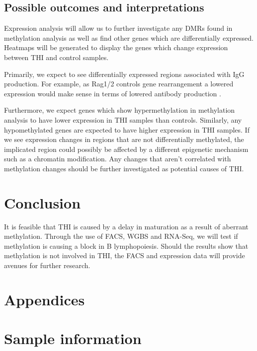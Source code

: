 \documentclass[12pt]{article}
\begin{document}
		\subsection{Possible outcomes and interpretations}				
			
			Expression analysis will allow us to  further investigate any DMRs found in methylation analysis as well as find other genes which are differentially expressed. 
			Heatmaps will be generated to display the genes which change expression between THI and control samples.
			
			Primarily, we expect to see differentially expressed regions associated with IgG production. 
			For example, as Rag1/2 controls gene rearrangement a lowered expression would make sense in terms of lowered antibody production \citep{Choukrallah14}.
			
			Furthermore, we expect genes which show hypermethylation in methylation analysis to have lower expression in THI samples than controls. 
			Similarly, any hypomethylated genes are expected to have higher expression in THI samples.
			If we see expression changes in regions that are not differentially methylated, the implicated region could possibly be affected by a different epigenetic mechanism such as a chromatin modification.
			Any changes that aren't correlated with methylation changes should be further investigated as potential causes of THI.
			

			
	\section{Conclusion}
	
		It is feasible that THI is caused by a delay in maturation as a result of aberrant methylation. 
		Through the use of FACS, WGBS and RNA-Seq, we will test if methylation is causing a block in B lymphopoiesis. 
		Should the results show that methylation is not involved in THI, the FACS and expression data will provide avenues for further research.


	\section{Appendices}
	\appendix

	
	\section{Sample information}
\end{document}
